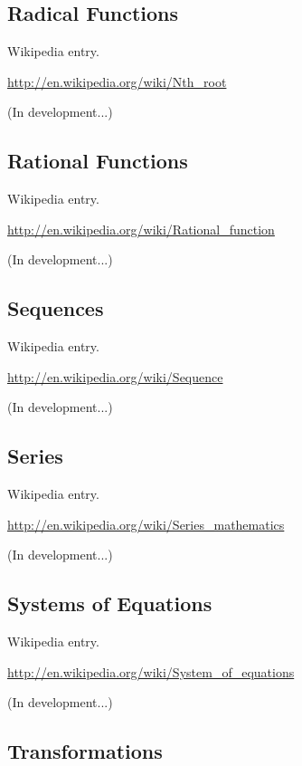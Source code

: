 \documentclass[12pt,oneside]{book}
\begin{document}
\subsection[Radical Functions]{Radical Functions}

Wikipedia entry.

\href{http://en.wikipedia.org/wiki/Nth_root}{http://en.wikipedia.org/wiki/Nth\_root}

(In development...)

\subsection[Rational Functions]{Rational Functions}

Wikipedia entry.

\href{http://en.wikipedia.org/wiki/Rational_function}{http://en.wikipedia.org/wiki/Rational\_function}

(In development...)

\subsection[Sequences]{Sequences}

Wikipedia entry.

\href{http://en.wikipedia.org/wiki/Sequence}{http://en.wikipedia.org/wiki/Sequence}

(In development...)

\subsection[Series]{Series}

Wikipedia entry.

\href{http://en.wikipedia.org/wiki/Series_mathematics}{http://en.wikipedia.org/wiki/Series\_mathematics}

(In development...)

\subsection[Systems of Equations]{Systems of Equations}

Wikipedia entry.

\href{http://en.wikipedia.org/wiki/System_of_equations}{http://en.wikipedia.org/wiki/System\_of\_equations}

(In development...)

\subsection[Transformations]{Transformations}
\end{document}

